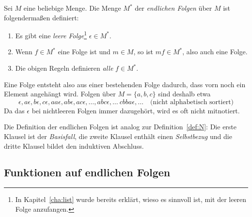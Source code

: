 \begin{definition}
  \label{def:finite-sequences}
  Sei $M$ eine beliebige Menge.  Die Menge $M^\ast$ der \textit{endlichen
    Folgen} über $M$ ist folgendermaßen definiert:
    \begin{enumerate}
    \item Es gibt eine \textit{leere Folge}\footnote{In
        Kapitel~\ref{cha:list} wurde bereits erklärt, wieso es sinnvoll
        ist, mit der leeren Folge anzufangen.}
     $\epsilon \in
      M^\ast$.
    \item Wenn $f \in M^\ast$ eine Folge ist und $m \in M$, so ist $mf
      \in M^\ast$, also auch eine Folge.
    \item Die obigen Regeln definieren \emph{alle} $f\in M^\ast$.
    \end{enumerate}
\end{definition}
%
Eine Folge entsteht also aus einer 
bestehenden Folge dadurch, dass vorn noch ein Element angehängt wird.  
Folgen über $M = \{a,b,c\}$ sind deshalb etwa
\[ \epsilon, a\epsilon, b\epsilon, c\epsilon, aa\epsilon ,
ab\epsilon , ac\epsilon ,\ldots, abc\epsilon,\ldots\ cbba\epsilon,
\ldots \quad\textrm{(nicht alphabetisch sortiert)}\]
Da das $\epsilon$ bei nichtleeren Folgen immer dazugehört, wird es oft
nicht mitnotiert.

Die Definition der endlichen Folgen ist analog zur
Definition~\ref{def:N}: Die erste Klausel ist der \textit{Basisfall},
die zweite Klausel enthält einen \textit{Selbstbezug} und die dritte
Klausel bildet den induktiven Abschluss.

\subsection{Funktionen auf endlichen Folgen}
\label{sec:functions-on-finite-sequences}

